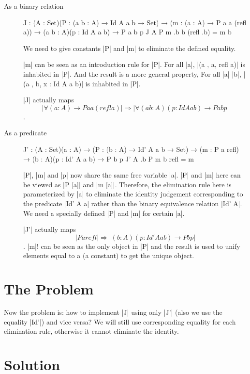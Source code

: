 \begin{description}
\item[As a binary relation]

\begin{code}
J : (A : Set)(P : (a b : A) → Id A a b → Set)
    → (m : (a : A) → P a a (refl a))
    → (a b : A)(p : Id A a b) → P a b p
J A P m .b b (refl .b) = m b
\end{code}
We need to give constants |P| and |m| to eliminate the defined equality.

|m| can be seen as an introduction rule for |P|. For all |a|, |(a , a, refl a)| is
inhabited in |P|. And the result is a more general
property, For all |a| |b|, |(a , b, x : Id A a b)| is inhabited in |P|.


|J| actually maps \[ |∀ (a : A) → P a a (refl a)|
\Rightarrow |∀ (a b : A)(p : Id A a b) → P a b p| \].

\item[As a predicate]

\begin{code}
J' : (A : Set)(a : A) 
  → (P : (b : A) → Id' A a b → Set)
  → (m : P a refl)
  → (b : A)(p : Id' A a b) → P b p
J' A .b P m b refl = m
\end{code}
|P|, |m| and |p| now share the same free variable |a|. |P| and |m| here can be viewed as |P [a]|
and |m [a]|. Therefore, the elimination rule here is parameterized by
|a| to eliminate the identity judgement corresponding to
the predicate |Id' A a| rather than the binary equivalence relation
|Id' A|. We need a specially defined |P| and |m| for certain |a|.
 
|J'| actually maps  \[|P a refl| \Rightarrow |(b : A)(p : Id' A a b) → P b p|\].
|m|! can be seen as the only object in |P| and the result is used to unify
elements equal to a (a constant) to get the unique object.
\end{description}

\section{The Problem}
Now the problem is: how to implement |J| using only |J'| (also we use the
equality |Id'|) and vice versa? We will still use corresponding equality for each
elimination rule, otherwise it cannot eliminate the identity.

\section{Solution}

